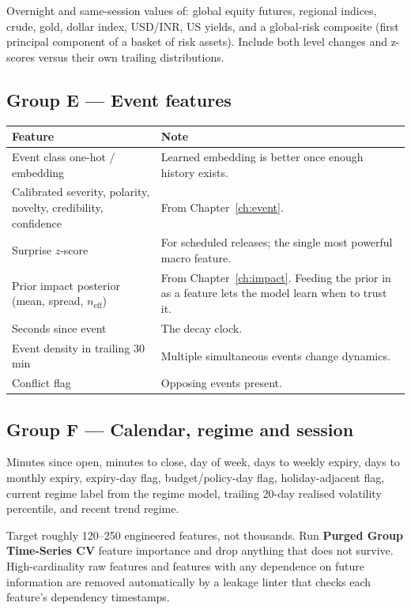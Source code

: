 Overnight and same-session values of: global equity futures, regional indices,
crude, gold, dollar index, USD/INR, US yields, and a global-risk composite
(first principal component of a basket of risk assets). Include both level
changes and z-scores versus their own trailing distributions.

\subsection{Group E --- Event features}

\begin{longtable}{@{}p{4.4cm}p{10.2cm}@{}}
\toprule
\textbf{Feature} & \textbf{Note}\\
\midrule
Event class one-hot / embedding & Learned embedding is better once enough
history exists.\\
Calibrated severity, polarity, novelty, credibility, confidence & From
Chapter~\ref{ch:event}.\\
Surprise $z$-score & For scheduled releases; the single most powerful macro
feature.\\
Prior impact posterior (mean, spread, $n_{\text{eff}}$) & From
Chapter~\ref{ch:impact}. Feeding the prior in as a feature lets the model learn
when to trust it.\\
Seconds since event & The decay clock.\\
Event density in trailing 30 min & Multiple simultaneous events change dynamics.\\
Conflict flag & Opposing events present.\\
\bottomrule
\end{longtable}

\subsection{Group F --- Calendar, regime and session}

Minutes since open, minutes to close, day of week, days to weekly expiry, days
to monthly expiry, expiry-day flag, budget/policy-day flag, holiday-adjacent
flag, current regime label from the regime model, trailing 20-day realised
volatility percentile, and recent trend regime.

\begin{keybox}[title={Feature hygiene}]
Target roughly 120--250 engineered features, not thousands. Run
\textbf{Purged Group Time-Series CV} feature importance and drop anything that
does not survive. High-cardinality raw features and features with any dependence
on future information are removed automatically by a leakage linter that checks
each feature's dependency timestamps.
\end{keybox}

